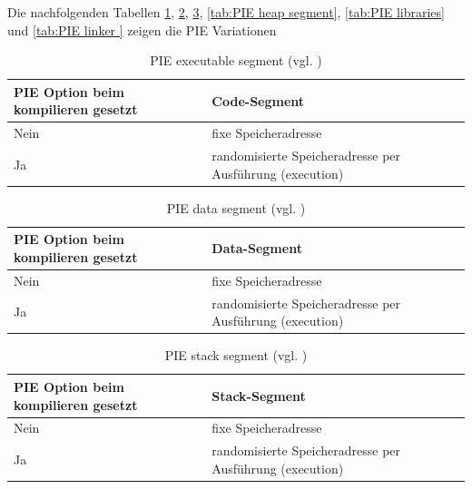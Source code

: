 Die nachfolgenden Tabellen \ref{tab:PIE executable segment}, \ref{tab:PIE data segment}, \ref{tab:PIE stack segment}, \ref{tab:PIE heap segment}, \ref{tab:PIE libraries} und \ref{tab:PIE linker } zeigen die PIE Variationen

 \begin{table}
    \begin{center}
         \begin{tabular}{|p{4cm}|p{11cm}|} \hline
            PIE Option beim kompilieren gesetzt & Code-Segment \\ \hline
            Nein & fixe Speicheradresse\\ \hline
            Ja & randomisierte Speicheradresse per Ausführung (execution)\\ \hline
        \end{tabular}
        \caption{PIE executable segment (vgl. \cite{iOSSec[5]}) }
       \label{tab:PIE executable segment}
    \end{center}
\end{table}

 \begin{table}
    \begin{center}
       \begin{tabular}{|p{4cm}|p{11cm}|} \hline
            PIE Option beim kompilieren gesetzt & Data-Segment\\ \hline
            Nein & fixe Speicheradresse\\ \hline
            Ja & randomisierte Speicheradresse per Ausführung (execution)\\ \hline
        \end{tabular}
        \caption{PIE data segment (vgl. \cite{iOSSec[5]})}
       \label{tab:PIE data segment}
    \end{center}
\end{table}

\begin{table}
    \begin{center}
       \begin{tabular}{|p{4cm}|p{11cm}|} \hline
            PIE Option beim kompilieren gesetzt & Stack-Segment\\ \hline
            Nein & fixe Speicheradresse\\ \hline
             Ja & randomisierte Speicheradresse per Ausführung (execution)\\ \hline
        \end{tabular}
         \caption{PIE stack segment (vgl. \cite{iOSSec[5]})}
       \label{tab:PIE stack segment}
    \end{center}
\end{table}    

